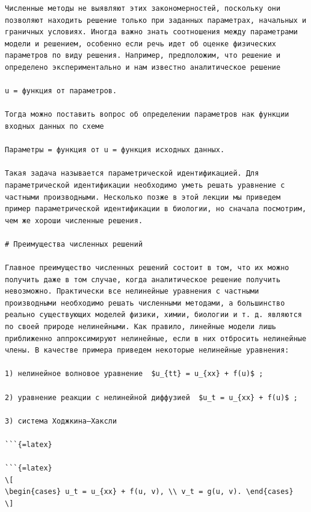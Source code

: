 \documentclass[
]{article}
\begin{document}
\begin{verbatim}
Численные методы не выявляют этих закономерностей, поскольку они позволяют находить решение только при заданных параметрах, начальных и граничных условиях. Иногда важно знать соотношения между параметрами модели и решением, особенно если речь идет об оценке физических параметров по виду решения. Например, предположим, что решение и определено экспериментально и нам известно аналитическое решение

u = функция от параметров.

Тогда можно поставить вопрос об определении параметров нак функции входных данных по схеме

Параметры = функция от u = функция исходных данных.

Такая задача называется параметрической идентификацией. Для параметрической идентификации необходимо уметь решать уравнение с частными производными. Несколько позже в этой лекции мы приведем пример параметрической идентификации в биологии, но сначала посмотрим, чем же хороши численные решения.

# Преимущества численных решений

Главное преимущество численных решений состоит в том, что их можно получить даже в том случае, когда аналитическое решение получить невозможно. Практически все нелинейные уравнения с частными производными необходимо решать численными методами, а большинство реально существующих моделей физики, химии, биологии и т. д. являются по своей природе нелинейными. Как правило, линейные модели лишь приближенно аппроксимируют нелинейные, если в них отбросить нелинейные члены. В качестве примера приведем некоторые нелинейные уравнения:

1) нелинейное волновое уравнение  $u_{tt} = u_{xx} + f(u)$ ;

2) уравнение реакции с нелинейной диффузией  $u_t = u_{xx} + f(u)$ ;

3) система Ходжкина—Хаксли  

```{=latex}

```{=latex}
\[
\begin{cases} u_t = u_{xx} + f(u, v), \\ v_t = g(u, v). \end{cases}
\]
\end{verbatim}
\end{document}
